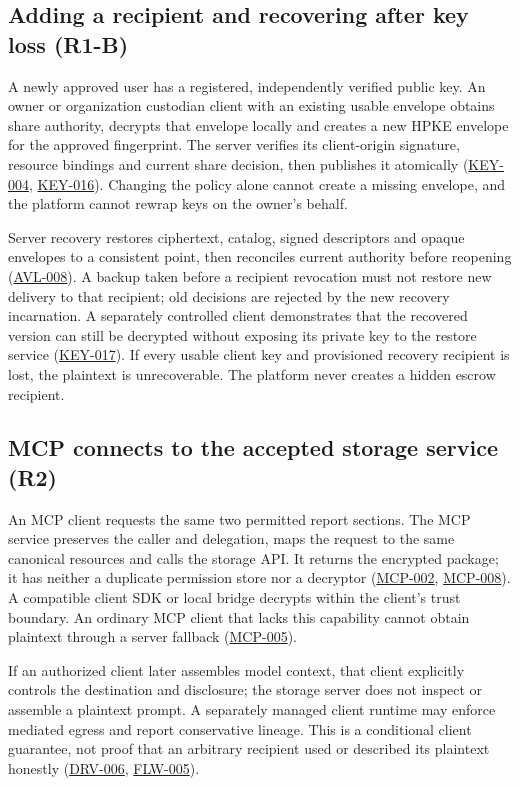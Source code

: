 \documentclass[11pt,a4paper]{article}
\newcommand{\rr}[1]{\hyperlink{req:#1}{#1}}
\begin{document}
\subsection{Adding a recipient and recovering after key loss (R1-B)}
A newly approved user has a registered, independently verified public key. An owner or organization custodian client with an existing usable envelope obtains share authority, decrypts that envelope locally and creates a new HPKE envelope for the approved fingerprint. The server verifies its client-origin signature, resource bindings and current share decision, then publishes it atomically (\rr{KEY-004}, \rr{KEY-016}). Changing the policy alone cannot create a missing envelope, and the platform cannot rewrap keys on the owner's behalf.

Server recovery restores ciphertext, catalog, signed descriptors and opaque envelopes to a consistent point, then reconciles current authority before reopening (\rr{AVL-008}). A backup taken before a recipient revocation must not restore new delivery to that recipient; old decisions are rejected by the new recovery incarnation. A separately controlled client demonstrates that the recovered version can still be decrypted without exposing its private key to the restore service (\rr{KEY-017}). If every usable client key and provisioned recovery recipient is lost, the plaintext is unrecoverable. The platform never creates a hidden escrow recipient.

\subsection{MCP connects to the accepted storage service (R2)}
An MCP client requests the same two permitted report sections. The MCP service preserves the caller and delegation, maps the request to the same canonical resources and calls the storage API. It returns the encrypted package; it has neither a duplicate permission store nor a decryptor (\rr{MCP-002}, \rr{MCP-008}). A compatible client SDK or local bridge decrypts within the client's trust boundary. An ordinary MCP client that lacks this capability cannot obtain plaintext through a server fallback (\rr{MCP-005}).

If an authorized client later assembles model context, that client explicitly controls the destination and disclosure; the storage server does not inspect or assemble a plaintext prompt. A separately managed client runtime may enforce mediated egress and report conservative lineage. This is a conditional client guarantee, not proof that an arbitrary recipient used or described its plaintext honestly (\rr{DRV-006}, \rr{FLW-005}).
\end{document}
